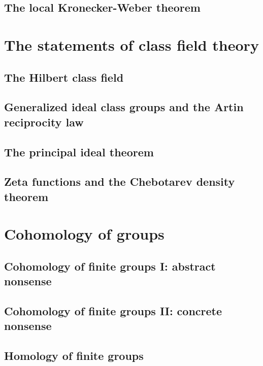 \documentclass{amsbook}
\begin{document}
\chapter{The local Kronecker-Weber theorem}


\part{The statements of class field theory}

\chapter{The Hilbert class field}


\chapter{Generalized ideal class groups and the Artin reciprocity law}


\chapter{The principal ideal theorem}
\label{chap:principal}


\chapter{Zeta functions and the Chebotarev density theorem}


\part{Cohomology of groups}

\chapter{Cohomology of finite groups I: abstract nonsense}


\chapter{Cohomology of finite groups II: concrete nonsense}


\chapter{Homology of finite groups}
\label{chap:homology}

\end{document}
